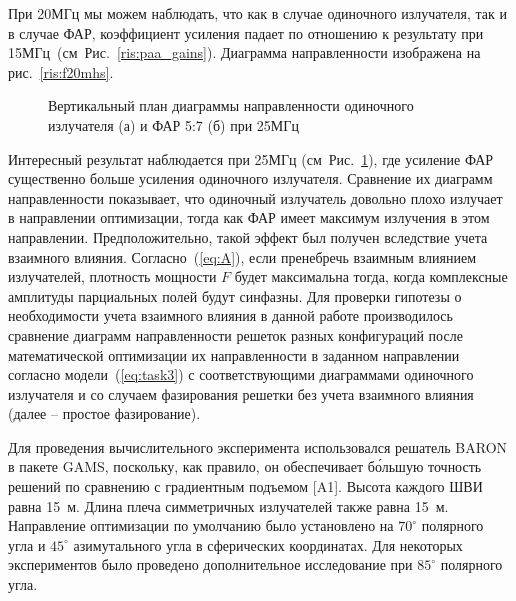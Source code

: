 При 20МГц мы можем наблюдать, что как в случае одиночного излучателя, так и в случае ФАР, коэффициент усиления падает по отношению к результату при 15МГц~(см~Рис.~\ref{ris:paa_gains}). Диаграмма направленности изображена на рис.~\ref{ris:f20mhs}.

\begin{figure}
\begin{minipage}[h]{0.49\linewidth}
\end{minipage}
\hfill
\begin{minipage}[h]{0.49\linewidth}
\end{minipage}
\caption{Вертикальный план диаграммы направленности одиночного излучателя (а) и ФАР 5:7 (б) при 25МГц}
\label{ris:f25mhs}
\end{figure}

Интересный результат наблюдается при 25МГц (см~Рис.~\ref{ris:f25mhs}), где усиление ФАР существенно больше усиления одиночного излучателя. Сравнение их диаграмм направленности показывает, что одиночный излучатель довольно плохо излучает в направлении оптимизации, тогда как ФАР имеет максимум излучения в этом направлении. Предположительно, такой эффект был получен вследствие учета взаимного влияния. Согласно~(\ref{eq:A}), если пренебречь взаимным влиянием излучателей, плотность мощности $F$ будет максимальна тогда, когда комплексные амплитуды парциальных полей будут синфазны. Для проверки гипотезы о необходимости учета взаимного влияния в данной работе производилось сравнение диаграмм направленности решеток разных конфигураций после математической оптимизации их направленности в заданном направлении согласно модели~(\ref{eq:task3}) с соответствующими диаграммами одиночного излучателя и со случаем фазирования решетки без учета взаимного влияния (далее – простое фазирование).

Для проведения вычислительного эксперимента использовался решатель BARON в пакете GAMS, поскольку, как правило, он обеспечивает бо́льшую точность решений по сравнению с градиентным подъемом [A1]. Высота каждого ШВИ равна 15~м. Длина плеча симметричных излучателей также равна 15~м. Направление оптимизации по умолчанию было установлено на $70^{\circ}$ полярного угла и $45^{\circ}$ азимутального угла в сферических координатах. Для некоторых экспериментов было проведено дополнительное исследование при $85^{\circ}$ полярного угла.


